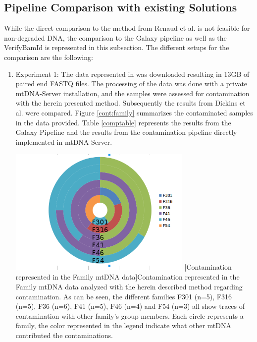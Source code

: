 \subsection{Pipeline Comparison with existing Solutions}
While the direct comparison to the method from Renaud et al. \cite{Renaud2015} is not feasible for non-degraded DNA, the comparison to the Galaxy pipeline \cite{Dickins2014} as well as the VerifyBamId \cite{Flickinger2015} is represented in this subsection. The different setups for the comparison are the following: 
\begin{enumerate}
\item Experiment 1: The data represented in \cite{Dickins2014} was downloaded resulting in 13GB of paired end FASTQ files. The processing of the data was done with a private mtDNA-Server installation, and the samples were assessed for contamination with the herein presented method. Subsequently the results from Dickins et al. were compared. Figure \ref{cont:family} summarizes the contaminated samples in the data provided. Table \ref{comptable} represents the results from the Galaxy Pipeline and the results from the contamination pipeline directly implemented in mtDNA-Server.
 \begin{minipage}{\linewidth}
    \centering
    \includegraphics[width=0.7\textwidth]{images/families.png}
    [Contamination represented in the Family mtDNA data]{Contamination represented in the Family mtDNA data  \cite{Dickins2014} analyzed with the herein described method regarding contamination. As can be seen, the different families F301 (n=5), F316 (n=5), F36 (n=6), F41 (n=5), F46 (n=4) and F54 (n=3) all show traces of contamination with other family's group members. Each circle represents a family, the color represented in the legend indicate what other mtDNA contributed the contaminations.} 
    \label{cont:family}
\end{minipage}


\end{enumerate}
